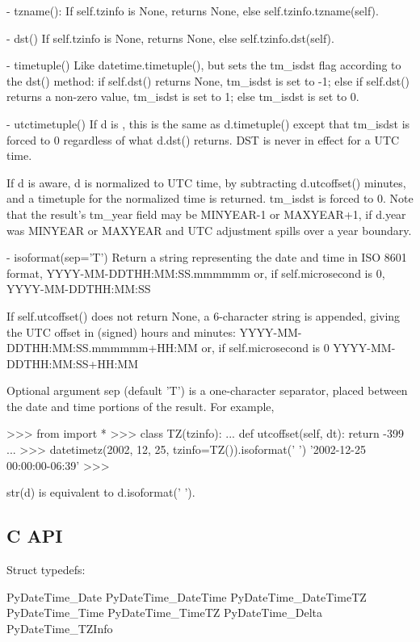 {  - tzname():
    If self.tzinfo is None, returns None, else self.tzinfo.tzname(self).

  - dst()
    If self.tzinfo is None, returns None, else self.tzinfo.dst(self).

  - timetuple()
    Like datetime.timetuple(), but sets the tm_isdst flag according to
    the dst() method:  if self.dst() returns None, tm_isdst is set to -1;
    else if self.dst() returns a non-zero value, tm_isdst is set to 1;
    else tm_isdst is set to 0.

  - utctimetuple()
    If  d is \naive, this is the same as d.timetuple() except
    that tm_isdst is forced to 0 regardless of what d.dst() returns.
    DST is never in effect for a UTC time.

    If d is aware, d is normalized to UTC time, by subtracting
    d.utcoffset() minutes, and a timetuple for the normalized time is
    returned.  tm_isdst is forced to 0.  Note that the result's
    tm_year field may be MINYEAR-1 or MAXYEAR+1, if d.year was MINYEAR
    or MAXYEAR and UTC adjustment spills over a year boundary.

  - isoformat(sep='T')
    Return a string representing the date and time in ISO 8601 format,
        YYYY-MM-DDTHH:MM:SS.mmmmmm
    or, if self.microsecond is 0,
        YYYY-MM-DDTHH:MM:SS

    If self.utcoffset() does not return None, a 6-character string is
    appended, giving the UTC offset in (signed) hours and minutes:
        YYYY-MM-DDTHH:MM:SS.mmmmmm+HH:MM
    or, if self.microsecond is 0
        YYYY-MM-DDTHH:MM:SS+HH:MM

    Optional argument sep (default 'T') is a one-character separator,
    placed between the date and time portions of the result.  For example,

        >>> from  import *
        >>> class TZ(tzinfo):
        ...     def utcoffset(self, dt): return -399
        ...
        >>> datetimetz(2002, 12, 25, tzinfo=TZ()).isoformat(' ')
        '2002-12-25 00:00:00-06:39'
        >>>

    str(d) is equivalent to d.isoformat(' ').


\subsection{C API}

Struct typedefs:

    PyDateTime_Date
    PyDateTime_DateTime
    PyDateTime_DateTimeTZ
    PyDateTime_Time
    PyDateTime_TimeTZ
    PyDateTime_Delta
    PyDateTime_TZInfo

}
